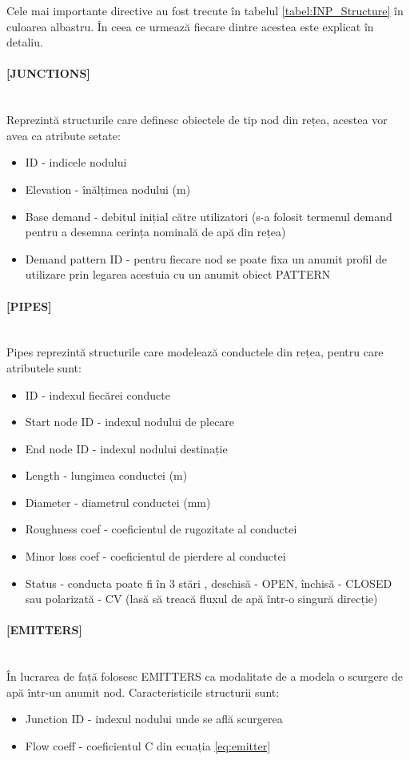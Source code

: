 Cele mai importante directive au fost trecute în tabelul \ref{tabel:INP_Structure} în culoarea albastru. În ceea ce urmează fiecare dintre acestea este explicat în detaliu.

\paragraph{[JUNCTIONS]} \mbox{} \\
Reprezintă structurile care definesc obiectele de tip nod din rețea, acestea vor avea ca atribute setate:
\begin{itemize}
    \item ID - indicele nodului
    \item Elevation - înălțimea nodului (m)
    \item Base demand - debitul inițial către utilizatori (s-a folosit termenul demand pentru a desemna cerința nominală de apă din rețea)
    \item Demand pattern ID - pentru fiecare nod se poate fixa un anumit profil de utilizare prin legarea acestuia cu un anumit obiect PATTERN
\end{itemize}

\paragraph{[PIPES]} \mbox{} \\
Pipes reprezintă structurile care modelează conductele din rețea, pentru care atributele sunt:

\begin{itemize}
    \item ID - indexul fiecărei conducte
    \item Start node ID - indexul nodului de plecare
    \item End node ID - indexul nodului destinație
    \item Length - lungimea conductei (m)
    \item Diameter - diametrul conductei (mm)
    \item Roughness coef - coeficientul de rugozitate al conductei
    \item Minor loss coef - coeficientul de pierdere al conductei
    \item Status - conducta poate fi în 3 stări , deschisă - OPEN, închisă - CLOSED sau polarizată - CV (lasă să treacă fluxul de apă într-o singură direcție)
\end{itemize}

\paragraph{[EMITTERS]} \mbox{} \\
În lucrarea de față folosesc EMITTERS ca modalitate de a modela o scurgere de apă într-un anumit nod. Caracteristicile structurii sunt:
\begin{itemize}
    \item Junction ID - indexul nodului unde se află scurgerea
    \item Flow coeff - coeficientul C din ecuația \eqref{eq:emitter}
\end{itemize}


